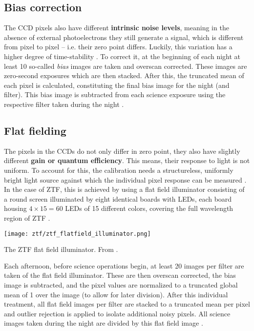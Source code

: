 \subsection{Bias correction}
The CCD pixels also have different \textbf{intrinsic noise levels}, meaning in the absence of external photoelectrons they still generate a signal, which is different from pixel to pixel -- i.e. their zero point differs. Luckily, this variation has a higher degree of time-stability . To correct it, at the beginning of each night at least 10 so-called \textit{bias} images are taken and overscan corrected. These images are zero-second exposures which are then stacked. After this, the truncated mean of each pixel is calculated, constituting the final bias image for the night (and filter). This bias image is subtracted from each science exposure using the respective filter taken during the night \cite{Masci2019a}.

\subsection{Flat fielding}
The pixels in the CCDs do not only differ in zero point, they also have slightly different \textbf{gain or quantum efficiency}. This means, their response to light is not uniform. To account for this, the calibration needs a structureless, uniformly bright light source against which the individual pixel response can be measured \cite{Howell2006}. In the case of ZTF, this is achieved by using a flat field illuminator consisting of a round screen illuminated by eight identical boards with LEDs, each board housing $4\times15=60$ LEDs of 15 different colors, covering the full wavelength region of ZTF \cite{Dekany2020}.
\begin{marginfigure}
    \texttt{[image: ztf/ztf\_flatfield\_illuminator.png]}
    \caption[ZTF flat field illuminator]{The ZTF flat field illuminator. From \cite{Dekany2020}.}
\end{marginfigure}
Each afternoon, before science operations begin, at least 20 images per filter are taken of the flat field illuminator. These are then overscan corrected, the bias image is subtracted, and the pixel values are normalized to a truncated global mean of 1 over the image (to allow for later division). After this individual treatment, all flat field images per filter are stacked to a truncated mean per pixel and outlier rejection is applied to isolate additional noisy pixels. All science images taken during the night are divided by this flat field image \cite{Masci2019a}.

